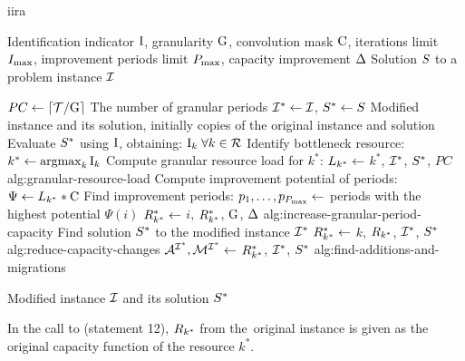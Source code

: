 \begin{algorithm}[t]
\caption{\acl{iira}}
\label{alg:identification-indicator-relaxing-algorithm}
\begin{algorithmic}[1]

\Params  Identification indicator $\mathrm{I}$, granularity $\mathrm{G}$, convolution mask $\mathrm{C}$,
\Paramsc iterations limit $\algMaxiter$, improvement periods limit $P_{\max}$,
\Paramsc capacity improvement $\Delta$
\Input  Solution $S$ to a problem instance $\mathcal{I}$

\State $PC \gets \lceil \mathcal{T} / \mathrm{G} \rceil$
       \Comment The number of granular periods
\State $\mathcal{I}^* \gets \mathcal{I}$, $S^* \gets S$
       \Comment Modified instance and its solution, initially
       \Statecr copies of the original instance and solution
\Repeat
    \State Evaluate $S^*$ using $\mathrm{I}$, obtaining:
           $\mathrm{I}_k \;\forall k \in \mathcal{R}$
    \State Identify bottleneck resource:
           $k^* \gets \operatorname*{\operatorname{argmax}}_k \mathrm{I}_k$
    \State Compute granular resource load for $k^*$:
     $L_{k^*} \gets $ %
                                                   {$k^*$, $\mathcal{I}^*$, $S^*$, $PC$}%
                                                   {alg:granular-resource-load}
    \State Compute improvement potential of periods: $\Psi \gets L_{k^*} * \mathrm{C}$
    \State Find improvement periods:
     $p_1, \dots, p_{P_{\max}} \gets$
            periods with the highest potential $\Psi(i)$
        \State $R_{k^*}^* \gets$ %
                                                 {$i$, $R_{k^*}^*$, $\mathrm{G}$, $\Delta$}%
                                                 {alg:increase-granular-period-capacity}
    \EndFor
    \State Find solution $S^*$ to the modified instance $\mathcal{I}^*$
    \State $R_{k^*}^* \gets$ %
                                             {$k$, $R_{k^*}$, $\mathcal{I}^*$, $S^*$}%
                                             {alg:reduce-capacity-changes}
    \State $\mathcal{A}^{\mathcal{I}^*}, \mathcal{M}^{\mathcal{I}^*} \gets $
                   {$R_{k^*}^*$, $\mathcal{I}^*$, $S^*$}%
                   {alg:find-additions-and-migrations}
\ForIter{$\algMaxiter$}

\Output Modified instance $\mathcal{I}$ and its solution $S^*$

\Note In the call to  (statement 12),
      $R_{k^*}$ from the~original instance is given as the original capacity function of the resource $k^*$.
\end{algorithmic}
\end{algorithm}

